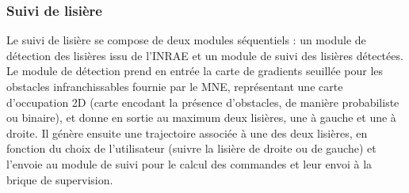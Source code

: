 

\subsubsection{Suivi de lisière}
Le suivi de lisière se compose de deux modules séquentiels : un module de détection des lisières issu de l'INRAE \cite{deremetz} et un module de suivi des lisières détectées.\\

\indent Le module de détection prend en entrée la carte de gradients seuillée pour les obstacles infranchissables fournie par le MNE, représentant une carte d'occupation 2D (carte encodant la présence d'obstacles, de manière probabiliste ou binaire), et donne en sortie au maximum deux lisières, une à gauche et une à droite. Il génère ensuite une trajectoire associée à une des deux lisières, en fonction du choix de l'utilisateur (suivre la lisière de droite ou de gauche) et l'envoie au module de suivi pour le calcul des commandes et leur envoi à la brique de supervision.\\

